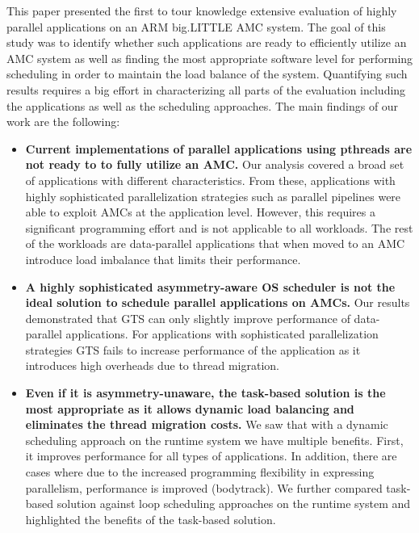 
This paper presented the first to tour knowledge extensive evaluation of highly parallel applications on an ARM big.LITTLE AMC system.
The goal of this study was to identify whether such applications are ready to efficiently utilize an AMC system as well as finding the most appropriate software level for performing scheduling in order to maintain the load balance of the system. 
Quantifying such results requires a big effort in characterizing all parts of the evaluation including the applications as well as the scheduling approaches. 
The main findings of our work are the following:
\begin{itemize}
	\item \textbf{Current implementations of parallel applications using pthreads are not ready to to fully utilize an AMC.}
	Our analysis covered a broad set of applications with different characteristics. 
	From these, applications with highly sophisticated parallelization strategies such as parallel pipelines were able to exploit AMCs at the application level.
	However, this requires a significant programming effort and is not applicable to all workloads.
	The rest of the workloads are data-parallel applications that when moved to an AMC introduce load imbalance that limits their performance. 
	\item \textbf{A highly sophisticated asymmetry-aware OS scheduler is not the ideal solution to schedule parallel applications on AMCs.}
	Our results demonstrated that GTS can only slightly improve performance of data-parallel applications. For applications with sophisticated parallelization strategies GTS fails to increase performance of the application as it introduces high overheads due to thread migration.
	\item \textbf{Even if it is asymmetry-unaware, the task-based solution is the most appropriate as it allows dynamic load balancing and eliminates the thread migration costs.}
	We saw that with a dynamic scheduling approach on the runtime system we have multiple benefits. 
	First, it improves performance for all types of applications. 
	In addition, there are cases where due to the increased programming flexibility in expressing parallelism, performance is improved (bodytrack).
	We further compared task-based solution against loop scheduling approaches on the runtime system and highlighted the benefits of the task-based solution.
\end{itemize}


